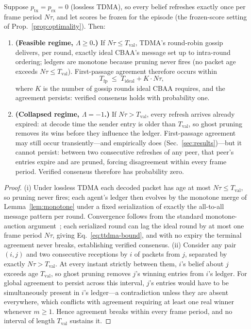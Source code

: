 \begin{theorem}\label{thm:noiseless}
Suppose $p_{\mathrm{tx}} = p_{\mathrm{rx}} = 0$ (lossless TDMA), so every belief refreshes exactly once per frame period $N\tau$, and let scores be frozen for the episode (the frozen-score setting of Prop.~\ref{prop:optimality}). Then:
\begin{enumerate}
    \item[(i)] \textbf{(Feasible regime, $\Lambda \geq 0$.)}
    If $N\tau \leq T_{\mathrm{val}}$, TDMA's round-robin gossip delivers, per round, exactly ideal CBAA's message set up to intra-round ordering; ledgers are monotone because pruning never fires (no packet age exceeds $N\tau \leq T_{\mathrm{val}}$).
    First-passage agreement therefore occurs within
    \begin{equation}
        T_{\mathrm{fp}} \;\leq\; T_{\mathrm{ideal}} + K \cdot N\tau,
        \label{eq:ttdma-bound}
    \end{equation}
    where $K$ is the number of gossip rounds ideal CBAA requires, and the agreement persists: verified consensus holds with probability one.
    \item[(ii)] \textbf{(Collapsed regime, $\Lambda = -1$.)}
    If $N\tau > T_{\mathrm{val}}$, every refresh arrives already expired: at decode time the sender entry is older than $T_{\mathrm{val}}$, so ghost pruning removes its wins before they influence the ledger. First-passage agreement may still occur transiently---and empirically does (Sec.~\ref{sec:results})---but it cannot persist: between two consecutive refreshes of any peer, that peer's entries expire and are pruned, forcing disagreement within every frame period. Verified consensus therefore has probability zero.
\end{enumerate}
\end{theorem}

\begin{proof}
(i) Under lossless TDMA each decoded packet has age at most $N\tau \leq T_{\mathrm{val}}$, so pruning never fires; each agent's ledger then evolves by the monotone merge of Lemma~\ref{lem:monotone} under a fixed serialization of exactly the all-to-all message pattern per round. Convergence follows from the standard monotone-auction argument~\cite{choi2009}; each serialized round can lag the ideal round by at most one frame period $N\tau$, giving Eq.~\eqref{eq:ttdma-bound}, and with no expiry the terminal agreement never breaks, establishing verified consensus.
(ii) Consider any pair $(i,j)$ and two consecutive receptions by $i$ of packets from $j$, separated by exactly $N\tau > T_{\mathrm{val}}$. At every instant strictly between them, $i$'s belief about $j$ exceeds age $T_{\mathrm{val}}$, so ghost pruning removes $j$'s winning entries from $i$'s ledger. For global agreement to persist across this interval, $j$'s entries would have to be simultaneously present in $i$'s ledger---a contradiction unless they are absent everywhere, which conflicts with agreement requiring at least one real winner whenever $m \geq 1$. Hence agreement breaks within every frame period, and no interval of length $T_{\mathrm{val}}$ sustains it.
\end{proof}

